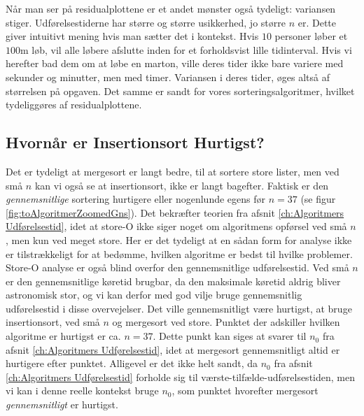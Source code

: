 Når man ser på residualplottene er et andet mønster også tydeligt: variansen stiger. Udførelsestiderne har større og større usikkerhed, jo større $n$ er. Dette giver intuitivt mening hvis man sætter det i kontekst. Hvis $10$ personer løber et $100$m løb, vil alle løbere afslutte inden for et forholdsvist lille tidinterval. Hvis vi herefter bad dem om at løbe en marton, ville deres tider ikke bare variere med sekunder og minutter, men med timer. Variansen i deres tider, øges altså af størrelsen på opgaven. Det samme er sandt for vores sorteringsalgoritmer, hvilket tydeliggøres af residualplottene. 


\subsection{Hvornår er Insertionsort Hurtigst?}%
\label{sub:Store-O er Værste Tilfælde}
Det er tydeligt at mergesort er langt bedre, til at sortere store lister, men ved små $n$ kan vi også se at insertionsort, ikke er langt bagefter. Faktisk er den \emph{gennemsnitlige} sortering hurtigere eller nogenlunde egens før $n = 37$ (se figur \ref{fig:toAlgoritmerZoomedGns}). Det bekræfter teorien fra afsnit \ref{ch:Algoritmers Udførelsestid}, idet at store-O ikke siger noget om algoritmens opførsel ved små $n$, men kun ved meget store. Her er det tydeligt at en sådan form for analyse ikke er tilstrækkeligt for at bedømme, hvilken algoritme er bedst til hvilke problemer. Store-O analyse er også blind overfor den gennemsnitlige udførelsestid. Ved små $n$ er den gennemsnitlige køretid brugbar, da den maksimale køretid aldrig bliver astronomisk stor, og vi kan derfor med god vilje bruge gennemsnitlig udførelsestid i disse overvejelser. Det ville gennemsnitligt være hurtigst, at bruge insertionsort, ved små $n$ og mergesort ved store. Punktet der adskiller hvilken algoritme er hurtigst er ca. $n = 37$. Dette punkt kan siges at svarer til $n_0$ fra afsnit \ref{ch:Algoritmers Udførelsestid}, idet at mergesort gennemsnitligt altid er hurtigere efter punktet. Alligevel er det ikke helt sandt, da $n_0$ fra afsnit \ref{ch:Algoritmers Udførelsestid} forholde sig til værste-tilfælde-udførelsestiden, men vi kan i denne reelle kontekst bruge $n_0$, som punktet hvorefter mergesort \emph{gennemsnitligt} er hurtigst.




